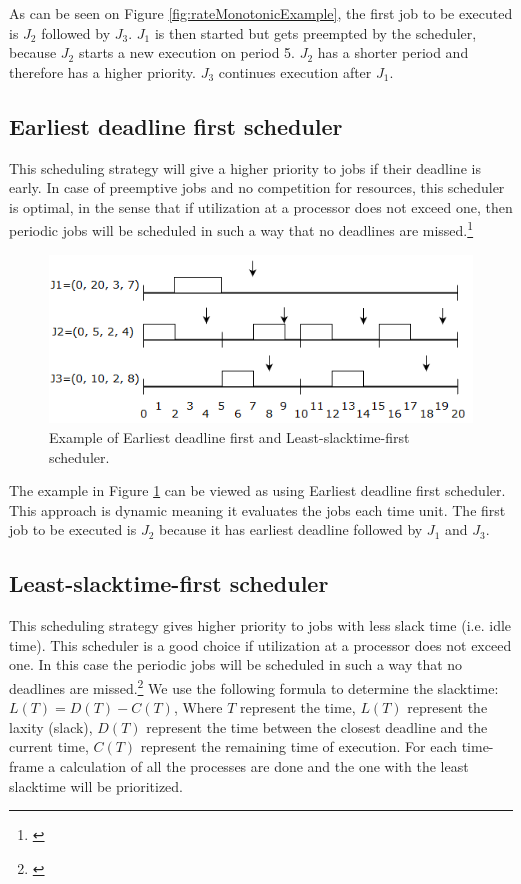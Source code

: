 As can be seen on Figure \ref{fig:rateMonotonicExample}, the first job to be executed is $J_2$ followed by $J_3$. $J_1$ is then started but gets preempted by the scheduler, because $J_2$ starts a new execution on period 5. $J_2$ has a shorter period and therefore has a higher priority. $J_3$ continues execution after $J_1$.

\subsection{Earliest deadline first scheduler}
This scheduling strategy will give a higher priority to jobs if their deadline is
early. In case of preemptive jobs and no competition for resources, this scheduler
is optimal, in the sense that if utilization at a processor does not exceed one, then
periodic jobs will be scheduled in such a way that no deadlines are missed.\footnote{\cite[p.~184]{Fokkink1965}}

\begin{figure}[!ht]
	\centering
	\includegraphics[scale=0.5]{realTimeComputing/fig/EarliestDeadlineFirst.png}
	\caption{Example of Earliest deadline first and Least-slacktime-first scheduler.}
	\label{fig:EarliestDeadlineFirstAndLeastSlacktimeFirstSchedulerExample}
\end{figure}

The example in Figure \ref{fig:EarliestDeadlineFirstAndLeastSlacktimeFirstSchedulerExample} can be viewed as using Earliest deadline first scheduler. This approach is dynamic meaning it evaluates the jobs each time unit. The first job to be executed is $J_2$ because it has earliest deadline followed by $J_1$ and $J_3$.

\subsection{Least-slacktime-first scheduler}
This scheduling strategy gives higher priority to jobs with less slack time (i.e. idle time). This scheduler is a good choice if utilization at a processor does not exceed one. In this case the periodic jobs will be scheduled in such a way that no deadlines are missed.\footnote{\cite[p.~184]{Fokkink1965}} We use the following formula to determine the slacktime: $L(T)=D(T)-C(T)$, Where $T$ represent the time, $L(T)$ represent the laxity (slack), $D(T)$ represent the time between the closest deadline and the current time, $C(T)$ represent the remaining time of execution. For each time-frame a calculation of all the processes are done and the one with the least slacktime will be prioritized.


